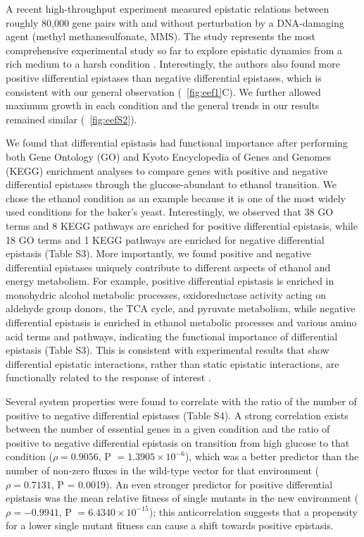A recent high-throughput experiment measured epistatic relations
between roughly 80,000 gene pairs with and without perturbation by a
DNA-damaging agent (methyl methanesulfonate, MMS). The study
represents the most comprehensive experimental study so far to explore
epistatic dynamics from a rich medium to a harsh condition
\citep{Bandyopadhyay2011}. Interestingly, the authors also found more
positive differential
epistases than negative differential epistases, which is consistent
with our general observation (\Fig~\ref{fig:eef1}C). We further allowed maximum
growth in each condition and the general trends in our results
remained similar (\Fig~\ref{fig:eefS2}).

We found that differential epistasis had functional importance after
performing both Gene Ontology (GO) and Kyoto Encyclopedia of Genes and
Genomes (KEGG) enrichment analyses to compare genes with positive and
negative differential epistases through the glucose-abundant to
ethanol transition. We chose the ethanol condition as an example
because it is one of the most widely used conditions for the baker’s
yeast. Interestingly, we observed that 38 GO terms and 8 KEGG pathways
are enriched for positive differential epistasis, while 18 GO terms
and 1 KEGG pathways are enriched for negative differential epistasis
(Table S3). More importantly, we found positive and negative
differential epistases uniquely contribute to different aspects of
ethanol and energy metabolism. For example, positive differential
epistasis is enriched in monohydric alcohol metabolic processes,
oxidoreductase activity acting on aldehyde group donors, the TCA
cycle, and pyruvate metabolism, while negative differential epistasis
is enriched in ethanol metabolic processes and various amino acid
terms and pathways, indicating the functional importance of
differential epistasis (Table S3). This is consistent with
experimental results that show differential epistatic interactions,
rather than static epistatic interactions, are functionally related to
the response of interest \citep{Bandyopadhyay2011}.

Several system properties were found to correlate with the ratio of
the number of positive to negative differential epistases (Table
S4). A strong correlation exists between the number of essential genes
in a given condition and the ratio of positive to negative
differential epistasis on transition from high glucose to that
condition ($\rho = 0.9056$, P $= 1.3905 \times 10^{-6}$), which was a better predictor
than the number of non-zero fluxes in the wild-type vector for that
environment ($\rho = 0.7131$, P = 0.0019). An even stronger predictor for
positive differential epistasis was the mean relative fitness of
single mutants in the new environment ($\rho = -0.9941$, P $= 6.4340 \times 10^{-15}$);
this anticorrelation suggests that a propensity for a lower single
mutant fitness can cause a shift towards positive epistasis.

